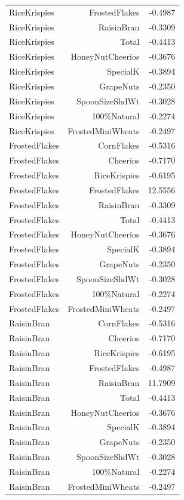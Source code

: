 \begin{longtable}{@{}lrr@{}}
RiceKrispies & FrostedFlakes & -0.4987 \\
RiceKrispies & RaisinBran & -0.3309 \\
RiceKrispies & Total & -0.4413 \\
RiceKrispies & HoneyNutCheerios & -0.3676 \\
RiceKrispies & SpecialK & -0.3894 \\
RiceKrispies & GrapeNuts & -0.2350 \\
RiceKrispies & SpoonSizeShdWt & -0.3028 \\
RiceKrispies & 100\%Natural & -0.2274 \\
RiceKrispies & FrostedMiniWheats & -0.2497 \\
FrostedFlakes & CornFlakes & -0.5316 \\
FrostedFlakes & Cheerios & -0.7170 \\
FrostedFlakes & RiceKrispies & -0.6195 \\
FrostedFlakes & FrostedFlakes & 12.5556 \\
FrostedFlakes & RaisinBran & -0.3309 \\
FrostedFlakes & Total & -0.4413 \\
FrostedFlakes & HoneyNutCheerios & -0.3676 \\
FrostedFlakes & SpecialK & -0.3894 \\
FrostedFlakes & GrapeNuts & -0.2350 \\
FrostedFlakes & SpoonSizeShdWt & -0.3028 \\
FrostedFlakes & 100\%Natural & -0.2274 \\
FrostedFlakes & FrostedMiniWheats & -0.2497 \\
RaisinBran & CornFlakes & -0.5316 \\
RaisinBran & Cheerios & -0.7170 \\
RaisinBran & RiceKrispies & -0.6195 \\
RaisinBran & FrostedFlakes & -0.4987 \\
RaisinBran & RaisinBran & 11.7909 \\
RaisinBran & Total & -0.4413 \\
RaisinBran & HoneyNutCheerios & -0.3676 \\
RaisinBran & SpecialK & -0.3894 \\
RaisinBran & GrapeNuts & -0.2350 \\
RaisinBran & SpoonSizeShdWt & -0.3028 \\
RaisinBran & 100\%Natural & -0.2274 \\
RaisinBran & FrostedMiniWheats & -0.2497 \\

\end{longtable}
